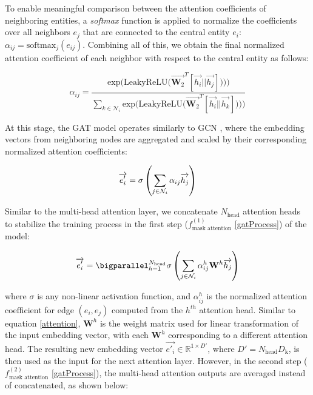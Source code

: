 To enable meaningful comparison between the attention coefficients of neighboring entities, a \textit{softmax} function is applied to normalize the coefficients over all neighbors $e_j$ that are connected to the central entity $e_i$: $\alpha_{ij} = \text{softmax}_j(e_{ij})$. Combining all of this, we obtain the final normalized attention coefficient of each neighbor with respect to the central entity as follows:

\begin{equation}
	\label{attentionCoeff}
	\alpha_{ij} = \frac{
		\text{exp} \Big( \text{LeakyReLU} \Big( \overrightarrow{\mathbf{W}_2}^{T} [ \overrightarrow{h_i} || \overrightarrow{h_j}]\Big) \Big))
	}
	{
		\sum_{k \in \mathcal{N}_i}
		\text{exp} \Big( \text{LeakyReLU} \Big( \overrightarrow{\mathbf{W}_2}^{T} [\overrightarrow{h_i} || \overrightarrow{h_k}]\Big) \Big))
	}
\end{equation}





At this stage, the GAT model operates similarly to GCN \cite{kipf2016semi}, where the embedding vectors from neighboring nodes are aggregated and scaled by their corresponding normalized attention coefficients:

\begin{equation}
	\label{scaleAttentionCoef}
	\centering
	{\overrightarrow{e'_i}}={\sigma\left(\sum_{j\in \mathcal{N}_i} {\alpha_{ij} \overrightarrow{h_j} }\right)}
\end{equation}

Similar to the multi-head attention layer, we concatenate $N_{\text{head}}$ attention heads to stabilize the training process in the first step ($f_{\text{mask attention}}^{(1)}$ \ref{gatProcess}) of the model:

\begin{equation}
	\label{multiHeadAttention}
	{\overrightarrow{e'_i}}={\bigparallel_{h=1}^{N_{\text{head}}}\sigma\left(\sum_{j\in \mathcal{N}_i}\alpha_{ij}^{h} \mathbf{W}^{h} \overrightarrow{h_{j}} \right)}
\end{equation}

where $\sigma$ is any non-linear activation function, and $\alpha_{ij}^h$ is the normalized attention coefficient for edge $(e_i, e_j)$ computed from the $h^{th}$ attention head. Similar to equation \ref{attention}, $\mathbf{W}^h$ is the weight matrix used for linear transformation of the input embedding vector, with each $\mathbf{W}^h$ corresponding to a different attention head. The resulting new embedding vector $\overrightarrow{e'_i} \in \mathbb{R}^{1 \times D'}$, where $D' = N_{\text{head}} D_{\text{k}}$, is then used as the input for the next attention layer. However, in the second step ($f_{\text{mask attention}}^{(2)}$ \ref{gatProcess}), the multi-head attention outputs are averaged instead of concatenated, as shown below:

